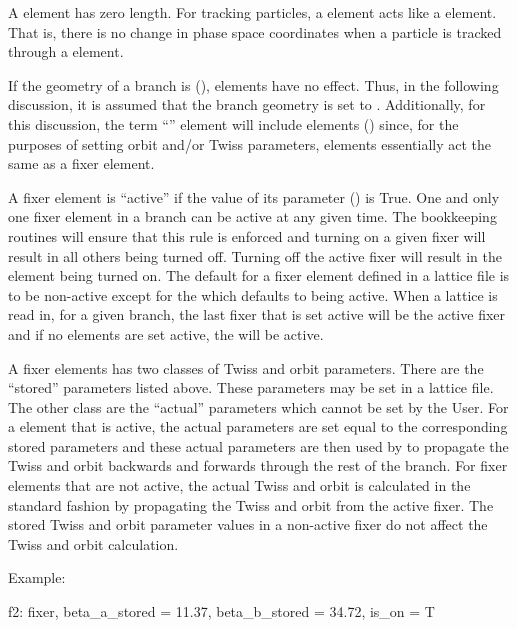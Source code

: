 A  element has zero length. For tracking particles, a  element acts like a
 element. That is, there is no change in phase space coordinates when a particle is
tracked through a  element.

If the geometry of a branch is  (),  elements have no effect.
Thus, in the following discussion, it is assumed that the branch geometry is set to .
Additionally, for this discussion, the term ``'' element will include 
elements () since, for the purposes of setting orbit and/or Twiss parameters,
 elements essentially act the same as a fixer element.

A fixer element is ``active'' if the value of its  parameter () is True. One
and only one fixer element in a branch can be active at any given time. The \bmad bookkeeping
routines will ensure that this rule is enforced and turning on a given fixer will result in all
others being turned off.  Turning off the active fixer will result in the  element
being turned on. The default for a fixer element defined in a lattice file is to be non-active
except for the  which defaults to being active. When a lattice is read in, for a
given branch, the last fixer that is set active will be the active fixer and if no 
elements are set active, the  will be active.

A fixer elements has two classes of Twiss and orbit parameters. There are the ``stored'' parameters
listed above. These parameters may be set in a lattice file. The other class are the ``actual''
parameters which cannot be set by the User. For a  element that is active, the actual
parameters are set equal to the corresponding stored parameters and these actual parameters are then
used by \bmad to propagate the Twiss and orbit backwards and forwards through the rest of the
branch. For fixer elements that are not active, the actual Twiss and orbit is calculated in the
standard fashion by propagating the Twiss and orbit from the active fixer. The stored Twiss and
orbit parameter values in a non-active fixer do not affect the Twiss and orbit calculation.

Example:
\begin{example}
  f2: fixer, beta_a_stored = 11.37, beta_b_stored = 34.72, is_on = T
\end{example}
\newpage


